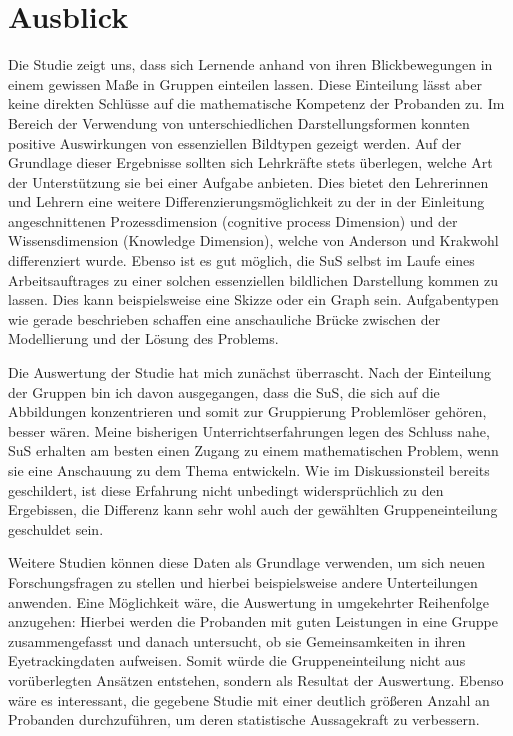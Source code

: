 \chapter{Ausblick}
Die Studie zeigt uns, dass sich Lernende anhand von ihren Blickbewegungen in einem gewissen Maße in Gruppen einteilen lassen. Diese Einteilung lässt aber keine direkten Schlüsse auf die mathematische Kompetenz der Probanden zu.  Im Bereich der Verwendung von unterschiedlichen Darstellungsformen konnten positive Auswirkungen von essenziellen Bildtypen gezeigt werden.  Auf der Grundlage dieser Ergebnisse sollten sich Lehrkräfte stets überlegen, welche Art der Unterstützung sie bei einer Aufgabe anbieten. Dies bietet den Lehrerinnen und Lehrern eine weitere Differenzierungsmöglichkeit zu der in der Einleitung angeschnittenen Prozessdimension (cognitive process Dimension) und der Wissensdimension (Knowledge Dimension), welche von Anderson und Krakwohl differenziert wurde\cite{anderson2001taxonomy}. Ebenso ist es gut möglich, die \gls{SuS} selbst im Laufe eines Arbeitsauftrages zu einer solchen essenziellen bildlichen Darstellung kommen zu lassen. Dies kann beispielsweise eine Skizze oder ein Graph sein. Aufgabentypen wie gerade beschrieben schaffen eine anschauliche Brücke zwischen der Modellierung und der Lösung des Problems.


Die Auswertung der Studie hat mich zunächst überrascht. Nach der Einteilung der Gruppen bin ich davon ausgegangen, dass die SuS, die sich auf die Abbildungen konzentrieren und somit zur Gruppierung Problemlöser gehören, besser wären. Meine bisherigen Unterrichtserfahrungen legen des Schluss nahe, SuS erhalten am besten einen Zugang zu einem mathematischen Problem, wenn sie eine Anschauung zu dem Thema entwickeln. Wie im Diskussionsteil bereits geschildert, ist diese Erfahrung nicht unbedingt widersprüchlich zu den Ergebissen, die Differenz kann sehr wohl auch der gewählten Gruppeneinteilung geschuldet sein. 


Weitere Studien können diese Daten als Grundlage verwenden, um sich neuen Forschungsfragen zu stellen und hierbei beispielsweise andere Unterteilungen anwenden. Eine Möglichkeit wäre, die Auswertung in umgekehrter Reihenfolge anzugehen: Hierbei werden die Probanden mit guten Leistungen in eine Gruppe zusammengefasst und danach untersucht, ob sie Gemeinsamkeiten in ihren Eyetrackingdaten aufweisen. Somit würde die Gruppeneinteilung nicht aus vorüberlegten Ansätzen entstehen, sondern als Resultat der Auswertung. 
Ebenso wäre es interessant, die gegebene Studie mit einer deutlich größeren Anzahl an Probanden durchzuführen, um deren statistische Aussagekraft zu verbessern.